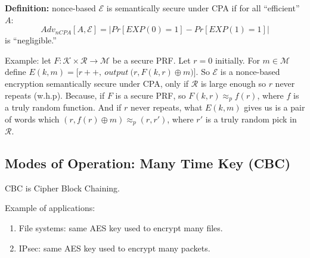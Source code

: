 \documentclass[12pt]{book}
\newcommand{\Def}{\textcolor{dkgreen}{\textbf{Definition:}} }
\begin{document}
\Def nonce-based $\mathcal{E}$ is semantically secure under CPA if for all ``efficient'' $A$:
$$Adv_{nCPA}[A,\mathcal{E}]=\big|Pr[EXP(0)=1]-Pr[EXP(1)=1]\big|$$is ``negligible.''

Example: let $F:\mathcal{K}\times\mathcal{R}\rightarrow\mathcal{M}$ be a secure PRF. Let $r=0$ initially. For $m\in\mathcal{M}$ define $E(k,m)=\big[r++,\ output\ \big(r,F(k,r)\oplus m\big)\big]$. So $\mathcal{E}$ is a nonce-based encryption semantically secure under CPA, only if $\mathcal{R}$ is large enough so $r$ never repeats (w.h.p). Because, if $F$ is a secure PRF, so $F(k,r)\approx_{p}f(r)$, where $f$ is a truly random function. And if $r$ never repeats, what $E(k,m)$ gives us is a pair of words which $(r,f(r)\oplus m)\approx_{p}(r,r')$, where $r'$ is a truly random pick in $\mathcal{R}$.

\subsection{Modes of Operation: Many Time Key (CBC)}
CBC is Cipher Block Chaining.

Example of applications:
\begin{enumerate}
	\item File systems: same AES key used to encrypt many files.
	\item IPsec: same AES key used to encrypt many packets.
\end{enumerate}
\end{document}
